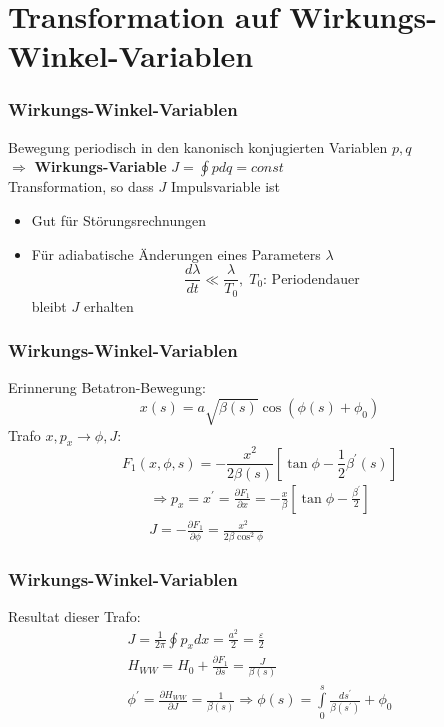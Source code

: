 \documentclass[hyperref={pdfpagelabels=false}]{beamer}
\begin{document}
\section{Transformation auf Wirkungs-Winkel-Variablen}
\begin{frame}
\frametitle{Wirkungs-Winkel-Variablen}
Bewegung periodisch in den kanonisch konjugierten Variablen $p,q$\\
$\Rightarrow$\textbf{ Wirkungs-Variable} $J = \oint p dq = const$\\
\vspace*{.7cm}\pause
Transformation, so dass $J$ Impulsvariable ist \begin{itemize}\item Gut für Störungsrechnungen  \item Für adiabatische Änderungen eines Parameters $\lambda$
\begin{equation*}
\frac{d\lambda }{dt} \ll \frac{\lambda}{T_0},\; T_0\text{: Periodendauer}
\end{equation*}
bleibt $J$ erhalten
\end{itemize}
\end{frame}
\begin{frame}
\frametitle{Wirkungs-Winkel-Variablen}
Erinnerung Betatron-Bewegung:
\begin{equation*}
x(s) = a \sqrt{\beta(s)} \cos (\phi(s) + \phi_0)
\end{equation*}
\pause
Trafo $x,p_x\rightarrow \phi,J$:
\begin{equation*}
F_1(x,\phi,s) = -\frac{x^2}{2\beta(s)}\left[ \tan \phi - \frac{1}{2}\beta^\prime(s)\right]
\end{equation*}\pause
\begin{gather*}\Rightarrow p_x = x^\prime = \frac{\partial F_1}{\partial x} = -\frac{x}{\beta}\left[\tan \phi - \frac{\beta^\prime}{2}\right]\\
J = - \frac{\partial F_1}{\partial \phi} = \frac{x^2}{2\beta\cos^2\phi}
\end{gather*}
\end{frame}

\begin{frame}
\frametitle{Wirkungs-Winkel-Variablen}
Resultat dieser Trafo:
\begin{gather*}
J = \frac{1}{2\pi} \oint p_x dx= \frac{a^2}{2} = \frac{\varepsilon}{2}\\
H_{WW} = H_0 + \frac{\partial F_1}{\partial s} =  \frac{J}{\beta(s)}\\
\phi^\prime = \frac{\partial H_{WW}}{\partial J} = \frac{1}{\beta(s)} \Rightarrow \phi(s) = \int\limits_{0}^s \frac{ds^\prime}{\beta(s^\prime)} + \phi_0
\end{gather*}
\end{frame}
\end{document}
